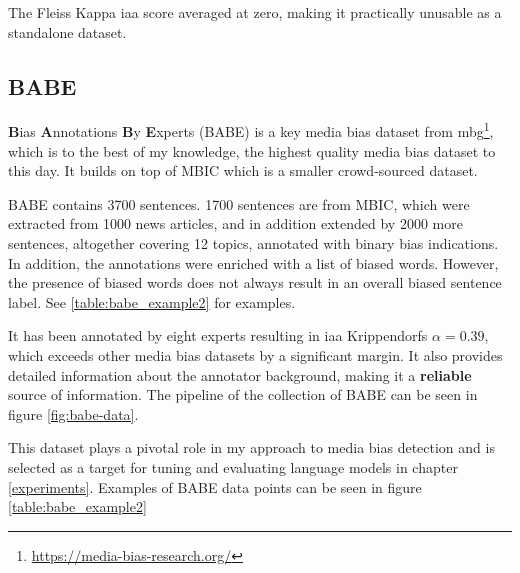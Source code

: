 The Fleiss Kappa \Gls{iaa} score averaged at zero, making it practically unusable as a standalone dataset.



\subsection{BABE}\label{babe}
\textbf{B}ias \textbf{A}nnotations \textbf{B}y \textbf{E}xperts (BABE)\cite{spinde2021neural} is a key media bias dataset from \Gls{mbg}\footnote{\url{https://media-bias-research.org/}}, which is to the best of my knowledge, the highest quality media bias dataset to this day. It builds on top of MBIC \cite{Spinde2021MBIC} which is a smaller crowd-sourced dataset.

BABE contains 3700 sentences. 1700 sentences are from MBIC, which were extracted from 1000 news articles, and in addition extended by 2000 more sentences, altogether covering 12 topics, annotated with binary bias indications. In addition, the annotations were enriched with a list of biased words. However, the presence of biased words does not always result in an overall biased sentence label. See \ref{table:babe_example2} for examples.

It has been annotated by eight experts resulting in \gls{iaa} Krippendorfs $\alpha = 0.39$, which exceeds other media bias datasets by a significant margin. It also provides detailed information about the annotator background, making it a \textbf{reliable} source of information. The pipeline of the collection of BABE can be seen in figure \ref{fig:babe-data}.

This dataset plays a pivotal role in my approach to media bias detection and is selected as a target for tuning and evaluating language models in chapter \ref{experiments}. Examples of BABE data points can be seen in figure
\ref{table:babe_example2}




